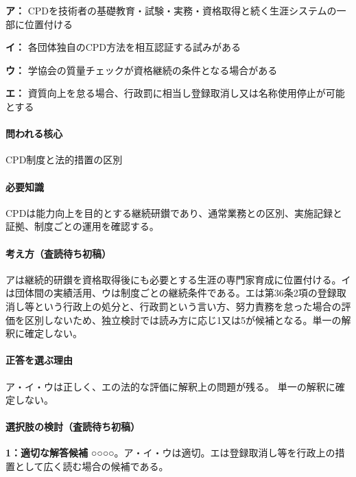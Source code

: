\noindent\textbf{ア：} CPDを技術者の基礎教育・試験・実務・資格取得と続く生涯システムの一部に位置付ける\par

\noindent\textbf{イ：} 各団体独自のCPD方法を相互認証する試みがある\par

\noindent\textbf{ウ：} 学協会の質量チェックが資格継続の条件となる場合がある\par

\noindent\textbf{エ：} 資質向上を怠る場合、行政罰に相当し登録取消し又は名称使用停止が可能とする\par

\paragraph{問われる核心} CPD制度と法的措置の区別

\paragraph{必要知識} CPDは能力向上を目的とする継続研鑚であり、通常業務との区別、実施記録と証拠、制度ごとの運用を確認する。

\paragraph{考え方（査読待ち初稿）} アは継続的研鑚を資格取得後にも必要とする生涯の専門家育成に位置付ける。イは団体間の実績活用、ウは制度ごとの継続条件である。エは第36条2項の登録取消し等という行政上の処分と、行政罰という言い方、努力責務を怠った場合の評価を区別しないため、独立検討では読み方に応じ1又は5が候補となる。単一の解釈に確定しない。

\paragraph{正答を選ぶ理由} ア・イ・ウは正しく、エの法的な評価に解釈上の問題が残る。 単一の解釈に確定しない。

\paragraph{選択肢の検討（査読待ち初稿）}\mbox{}\par

\noindent\textbf{1：適切な解答候補} ○○○○。ア・イ・ウは適切。エは登録取消し等を行政上の措置として広く読む場合の候補である。\par

